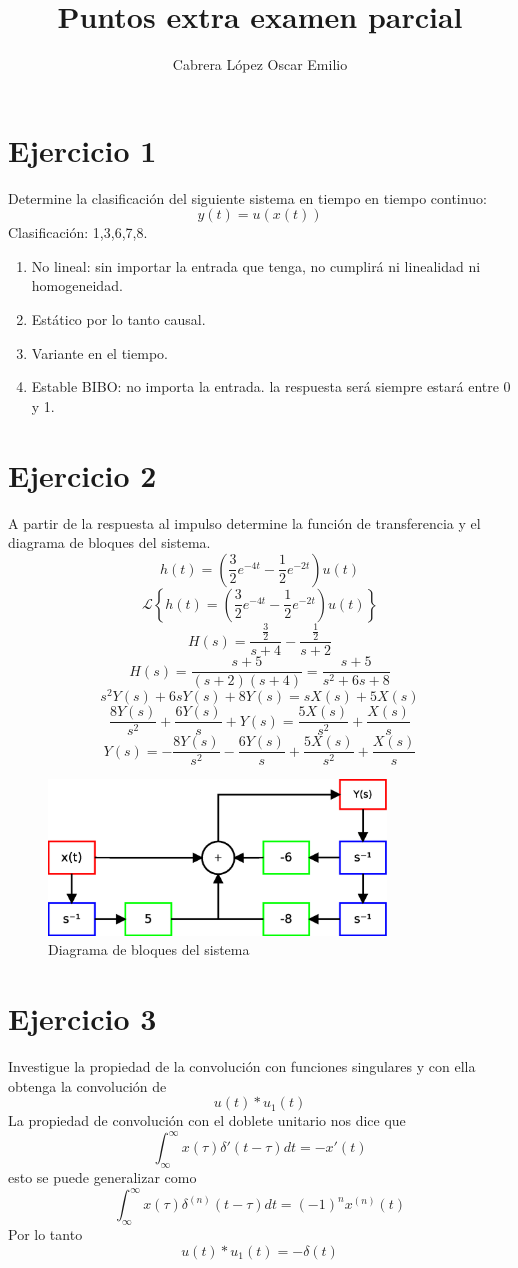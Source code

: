 \documentclass[a4paper,12pt]{article}
\title{Puntos extra examen parcial}
\author{
  Cabrera López Oscar Emilio
}
\begin{document}
\thispagestyle{fancy}
\maketitle
\newpage
\tableofcontents
\newpage

\section{Ejercicio 1}
Determine la clasificación del siguiente sistema en tiempo en tiempo continuo:
\[ y(t) = u(x(t)) \]
Clasificación: 1,3,6,7,8.
\begin{enumerate}
    \item No lineal: sin importar la entrada que tenga, no cumplirá ni linealidad ni homogeneidad.
    \item Estático por lo tanto causal.
    \item Variante en el tiempo.
    \item Estable BIBO: no importa la entrada. la respuesta será siempre estará entre 0 y 1.
\end{enumerate}
\section{Ejercicio 2}
A partir de la respuesta al impulso determine la función de transferencia y el diagrama de bloques del sistema.
\[ h(t)=\left(\frac{3}{2}e^{-4t}-\frac{1}{2}e^{-2t}\right)u(t) \]
\[ \mathcal{L}\left\{h(t)=\left(\frac{3}{2}e^{-4t}-\frac{1}{2}e^{-2t}\right)u(t)\right\} \]
\[ H(s) = \frac{\frac{3}{2}}{s+4} - \frac{\frac{1}{2}}{s+2} \]
\[ H(s) = \frac{s+5}{(s+2)(s+4)} = \frac{s+5}{s^2+6s+8} \]
\[ s^2Y(s)+6sY(s)+8Y(s) = sX(s)+5X(s)  \]
\[ \frac{8Y(s)}{s^2}+\frac{6Y(s)}{s}+Y(s) = \frac{5X(s)}{s^2}+\frac{X(s)}{s} \]
\[ Y(s) = -\frac{8Y(s)}{s^2}-\frac{6Y(s)}{s}+\frac{5X(s)}{s^2}+\frac{X(s)}{s} \]
\begin{figure}[H]
  \begin{center}
    \includegraphics[width=0.8\textwidth]{Diagrama}
    \caption{Diagrama de bloques del sistema}
    \label{fig:dia}
  \end{center}
\end{figure}
\section{Ejercicio 3}
Investigue la propiedad de la convolución con funciones singulares y con ella obtenga la convolución de
\[ u(t)\ast u_{1}(t) \]
La propiedad de convolución con el doblete unitario nos dice que
\[ \int_{\infty}^{\infty}x(\tau)\delta'(t-\tau)dt = -x'(t) \]
esto se puede generalizar como 
\[ \int_{\infty}^{\infty}x(\tau)\delta^{(n)}(t-\tau)dt = (-1)^nx^{(n)}(t) \]
Por lo tanto
\[ u(t)\ast u_{1}(t) = -\delta(t) \]
\end{document}
